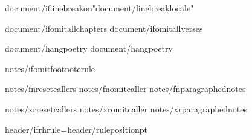 \def\regular{{"{fontregular/name}"}}
\def\bold{{"{fontbold/name}:{fontbold/embolden}{fontbold/slant}"}}
\def\italic{{"{fontitalic/name}:{fontitalic/embolden}{fontitalic/slant}"}}
\def\bolditalic{{"{fontbolditalic/name}:{fontbolditalic/embolden}{fontbolditalic/slant}"}}

{document/iflinebreakon}\XeTeXlinebreaklocale "{document/linebreaklocale}"

{document/ifomitallchapters}\def\AfterChapterSpaceFactor{{10}}
{document/ifomitallverses}\def\AfterVerseSpaceFactor{{0}}

{document/hangpoetry}
{document/hangpoetry}



{notes/ifomitfootnoterule}\def\footnoterule{{}} 

{notes/fnresetcallers}
{notes/fnomitcaller}
{notes/fnparagraphednotes}

{notes/xrresetcallers}
{notes/xromitcaller}
{notes/xrparagraphednotes}

\def\HeaderPosition{{{header/headerposition}}}
\def\FooterPosition{{{header/footerposition}}}
{header/ifrhrule}\RHruleposition={header/ruleposition}pt

